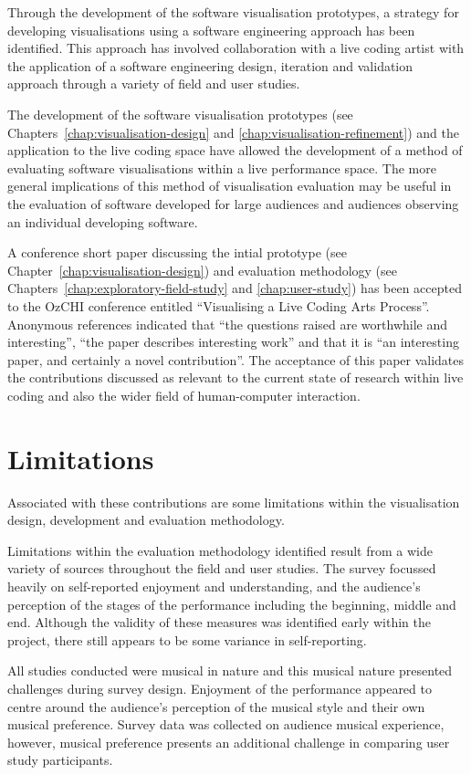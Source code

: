 Through the development of the software visualisation prototypes, a strategy for developing visualisations using a software engineering approach has been identified. This approach has involved collaboration with a live coding artist with the application of a software engineering design, iteration and validation approach through a variety of field and user studies.

The development of the software visualisation prototypes (see Chapters~\ref{chap:visualisation-design} and \ref{chap:visualisation-refinement}) and the application to the live coding space have allowed the development of a method of evaluating software visualisations within a live performance space. The more general implications of this method of visualisation evaluation may be useful in the evaluation of software developed for large audiences and audiences observing an individual developing software.

A conference short paper discussing the intial prototype (see Chapter~\ref{chap:visualisation-design}) and evaluation methodology (see Chapters~\ref{chap:exploratory-field-study} and \ref{chap:user-study}) has been accepted to the OzCHI conference entitled ``Visualising a Live Coding Arts Process''. Anonymous references indicated that ``the questions raised are worthwhile and interesting'', ``the paper describes interesting work'' and that it is ``an interesting paper, and certainly a novel contribution''. The acceptance of this paper validates the contributions discussed as relevant to the current state of research within live coding and also the wider field of human-computer interaction.

\section{Limitations}

Associated with these contributions are some limitations within the visualisation design, development and evaluation methodology.

Limitations within the evaluation methodology identified result from a wide variety of sources throughout the field and user studies. The survey focussed heavily on self-reported enjoyment and understanding, and the audience's perception of the stages of the performance including the beginning, middle and end. Although the validity of these measures was identified early within the project, there still appears to be some variance in self-reporting.

All studies conducted were musical in nature and this musical nature presented challenges during survey design. Enjoyment of the performance appeared to centre around the audience's perception of the musical style and their own musical preference. Survey data was collected on audience musical experience, however, musical preference presents an additional challenge in comparing user study participants.

